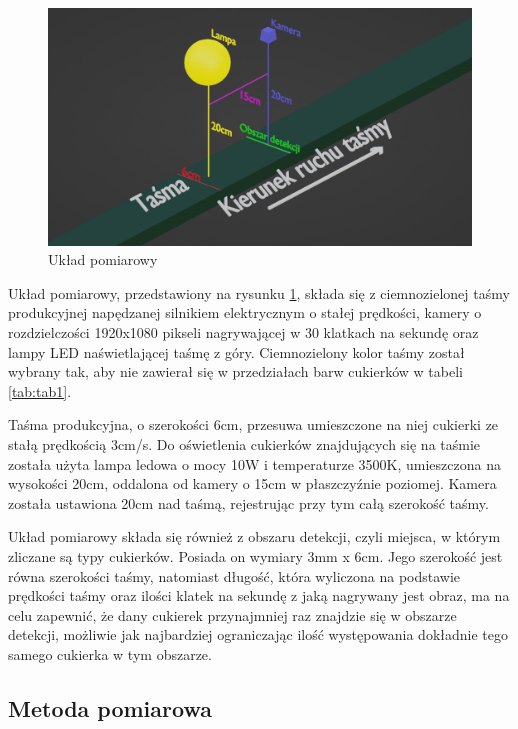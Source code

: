 \documentclass{article}
\begin{document}
\begin{figure}[H]
    \centering
    \includegraphics[width=\linewidth]{ukladPomiarowy.png}
    \caption{Układ pomiarowy}
    \label{fig:ukladPomiarowy}
\end{figure}

Układ pomiarowy, przedstawiony na rysunku \ref{fig:ukladPomiarowy}, składa się z ciemnozielonej taśmy produkcyjnej napędzanej silnikiem elektrycznym o stałej prędkości, kamery o rozdzielczości 1920x1080 pikseli nagrywającej w 30 klatkach na sekundę oraz lampy LED naświetlającej taśmę z góry. Ciemnozielony kolor taśmy został wybrany tak, aby nie zawierał się w przedziałach barw cukierków w tabeli \ref{tab:tab1}.

Taśma produkcyjna, o szerokości 6cm, przesuwa umieszczone na niej cukierki ze stałą prędkością 3cm/s. Do oświetlenia cukierków znajdujących się na taśmie została użyta lampa ledowa o mocy 10W i temperaturze 3500K, umieszczona na wysokości 20cm, oddalona od kamery o 15cm w płaszczyźnie poziomej. Kamera została ustawiona 20cm nad taśmą, rejestrując przy tym całą szerokość taśmy.

Układ pomiarowy składa się również z obszaru detekcji, czyli miejsca, w którym zliczane są typy cukierków. Posiada on wymiary 3mm x 6cm. Jego szerokość jest równa szerokości taśmy, natomiast długość, która wyliczona na podstawie prędkości taśmy oraz ilości klatek na sekundę z jaką nagrywany jest obraz, ma na celu zapewnić, że dany cukierek przynajmniej raz znajdzie się w obszarze detekcji, możliwie jak najbardziej ograniczając ilość występowania dokładnie tego samego cukierka w tym obszarze.

\subsection{Metoda pomiarowa}
\label{Metoda pomiarowa}
\end{document}
